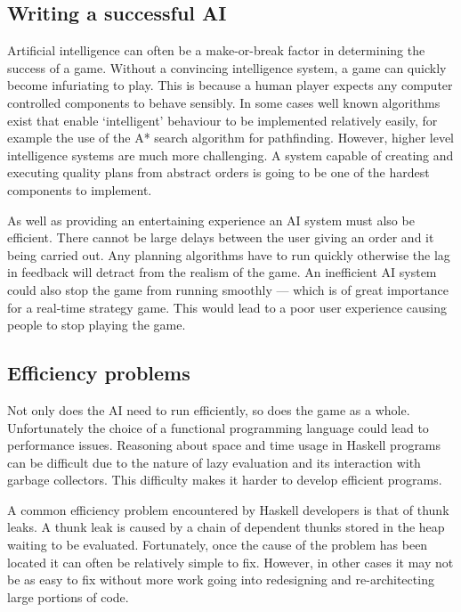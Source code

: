 \subsection{Writing a successful AI}

Artificial intelligence can often be a make-or-break factor in determining the success of
a game. Without a convincing intelligence system, a game can
quickly become infuriating to play. This is because a human player expects any computer
controlled components to behave sensibly. In some cases well known algorithms exist that
enable `intelligent' behaviour to be implemented relatively easily, for example the use
of the A* search algorithm for pathfinding. However, higher level intelligence systems
are much more challenging. A system capable of creating and executing quality plans
from abstract orders is going to be one of the hardest components to implement.

As well as providing an entertaining experience an AI system must also be efficient.
There cannot be large delays between the user giving an order and it being carried
out. Any planning algorithms have to run quickly otherwise the lag in feedback will
detract from the realism of the game. An inefficient AI system could also stop the game
from running smoothly --- which is of great importance for a real-time strategy game.
This would lead to a poor user experience causing people to stop playing the game.

\subsection{Efficiency problems}

Not only does the AI need to run efficiently, so does the game as a whole. Unfortunately
the choice of a functional programming language could lead to performance issues.
Reasoning about space and time usage in Haskell programs can be difficult due
to the nature of lazy evaluation and its interaction with garbage collectors.\cite{cheplyaka2012}
This difficulty makes it harder to develop efficient programs.

A common efficiency problem encountered by Haskell developers is that of thunk leaks.
A thunk leak is caused by a chain of dependent thunks stored in the heap waiting to
be evaluated. Fortunately, once the cause of the problem has been located it can often
be relatively simple to fix.\cite{ezyang2011} However, in other cases it may not be
as easy to fix without more work going into redesigning and re-architecting large
portions of code.

